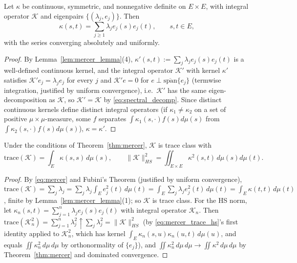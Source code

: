 \begin{theorem}
\label{thm:mercer}
Let $\kappa$ be continuous, symmetric, and nonnegative definite on
$E\times E$, with integral operator $\mathcal{K}$ and eigenpairs
$\{(\lambda_j,e_j)\}$. Then
\begin{equation}
\kappa(s,t) = \sum_{j\geq 1}\lambda_j e_j(s)e_j(t), \qquad s,t\in E,
\label{eq:mercer}
\end{equation}
with the series converging absolutely and uniformly.
\end{theorem}

\begin{proof}
By Lemma~\ref{lem:mercer_lemma}(4), $\kappa'(s,t):=\sum_j\lambda_je_j(s)
e_j(t)$ is a well-defined continuous kernel, and the integral operator
$\mathcal{K}'$ with kernel $\kappa'$ satisfies $\mathcal{K}'e_j = \lambda_j
e_j$ for every $j$ and $\mathcal{K}'e = 0$ for $e\perp\overline{
\mathrm{span}}\{e_j\}$ (termwise integration, justified by uniform
convergence), i.e.\ $\mathcal{K}'$ has the same eigen-decomposition as
$\mathcal{K}$, so $\mathcal{K}'=\mathcal{K}$ by
\eqref{eq:spectral_decomp}. Since distinct continuous kernels define
distinct integral operators (if $\kappa_1\neq\kappa_2$ on a set of
positive $\mu\times\mu$-measure, some $f$ separates $\int\kappa_1(s,\cdot)
f(s)d\mu(s)$ from $\int\kappa_2(s,\cdot)f(s)d\mu(s)$), $\kappa=\kappa'$.
\end{proof}

\begin{theorem}
\label{thm:mercer_trace_hs}
Under the conditions of Theorem~\ref{thm:mercer}, $\mathcal{K}$ is trace
class with
\begin{equation}
\mathrm{trace}(\mathcal{K}) = \int_E\kappa(s,s)\,d\mu(s), \qquad
\|\mathcal{K}\|_{HS}^2 = \iint_{E\times E}\kappa^2(s,t)\,d\mu(s)d\mu(t).
\label{eq:mercer_trace_hs}
\end{equation}
\end{theorem}

\begin{proof}
By \eqref{eq:mercer} and Fubini's Theorem (justified by uniform
convergence), $\mathrm{trace}(\mathcal{K})=\sum_j\lambda_j = \sum_j
\lambda_j\int_Ee_j^2(t)\,d\mu(t) = \int_E\sum_j\lambda_je_j^2(t)\,d\mu(t) =
\int_E\kappa(t,t)\,d\mu(t)$, finite by Lemma~\ref{lem:mercer_lemma}(1); so
$\mathcal{K}$ is trace class. For the HS norm, let $\kappa_n(s,t)=
\sum_{j=1}^n\lambda_je_j(s)e_j(t)$ with integral operator $\mathcal{K}_n$.
Then $\mathrm{trace}(\mathcal{K}_n^2)=\sum_{j=1}^n\lambda_j^2\uparrow
\sum_j\lambda_j^2=\|\mathcal{K}\|_{HS}^2$ (by \eqref{eq:mercer_trace_hs}'s
first identity applied to $\mathcal{K}_n^2$, which has kernel
$\int_E\kappa_n(s,u)\kappa_n(u,t)\,d\mu(u)$, and equals $\iint\kappa_n^2\,
d\mu\,d\mu$ by orthonormality of $\{e_j\}$), and $\iint\kappa_n^2\,d\mu\,
d\mu\to\iint\kappa^2\,d\mu\,d\mu$ by Theorem~\ref{thm:mercer} and dominated
convergence.
\end{proof}

